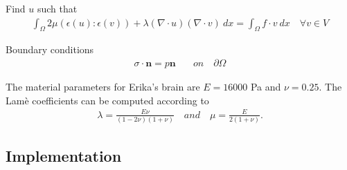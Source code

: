 \documentclass[epsfig,11pt]{article}
\begin{document}
Find $u$ such that 
\begin{align*}
  \int_\Omega  2\mu (\epsilon(u) : \epsilon(v))  +\lambda (\nabla \cdot u) (\nabla \cdot v) \: dx = \int_\Omega f \cdot v \: dx \quad \forall v \in V
\end{align*} 

Boundary conditions
\begin{align*}
\sigma \cdot \mathbf{n} = p\mathbf{n} \quad &on \quad \partial \Omega
\end{align*}

The material parameters for Erika's brain are $E = 16000 $ Pa and $\nu = 0.25$. The Lamè coefficients can be computed according to 
\begin{align*}
\lambda = \frac{E \nu}{(1-2\nu)(1+\nu)} \quad and \quad \mu = \frac{E}{2(1+\nu)}.
\end{align*}

\subsection{Implementation}
\end{document}
